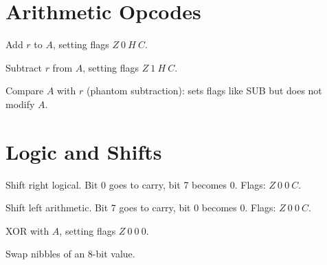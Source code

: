 \section{Arithmetic Opcodes}

\begin{definition}[ADD A, r]\label{def:exec_add}
  \leanok
  Add $r$ to $A$, setting flags $Z\ 0\ H\ C$.
\end{definition}

\begin{definition}[SUB r]\label{def:exec_sub}
  \leanok
  Subtract $r$ from $A$, setting flags $Z\ 1\ H\ C$.
\end{definition}

\begin{definition}[CP r]\label{def:exec_cp}
  \leanok
  Compare $A$ with $r$ (phantom subtraction): sets flags like SUB but does not modify $A$.
\end{definition}

\section{Logic and Shifts}

\begin{definition}[SRL r]\label{def:exec_srl}
  \leanok
  Shift right logical. Bit 0 goes to carry, bit 7 becomes 0. Flags: $Z\ 0\ 0\ C$.
\end{definition}

\begin{definition}[SLA r]\label{def:exec_sla}
  \leanok
  Shift left arithmetic. Bit 7 goes to carry, bit 0 becomes 0. Flags: $Z\ 0\ 0\ C$.
\end{definition}

\begin{definition}[XOR r]\label{def:exec_xor}
  \leanok
  XOR with $A$, setting flags $Z\ 0\ 0\ 0$.
\end{definition}

\begin{definition}[SWAP r]\label{def:exec_swap}
  \leanok
  Swap nibbles of an 8-bit value.
\end{definition}

